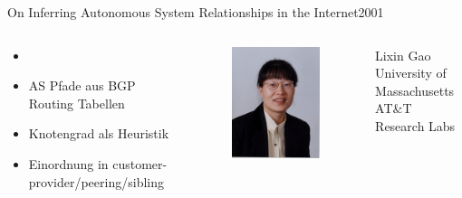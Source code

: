 \documentclass[ngerman,compress,hyperref={bookmarks}]{beamer}
\begin{document}
\begin{frame}{On Inferring Autonomous System Relationships in the Internet}{2001}
\begin{columns}[c]
 \begin{column}{0.5\textwidth}
  \begin{itemize}
   \item \cite{Gao:2001:IAS:504611.504616}
   \item AS Pfade aus BGP Routing Tabellen
   \item Knotengrad als Heuristik
   \item Einordnung in customer-provider/peering/sibling
  \end{itemize}
 \end{column}
 \begin{column}{0.1\textwidth}
  \begin{figure}
   \includegraphics[width=1\textwidth]{images/gao}
   \label{gao}
  \end{figure}
 \end{column}
 \begin{column}{0.3\textwidth}
  {\scriptsize Lixin Gao\\
  \vspace{0.1cm}
  University of Massachusetts\\
  AT\&T Research Labs}
 \end{column}
\end{columns}
\end{frame}
\end{document}

